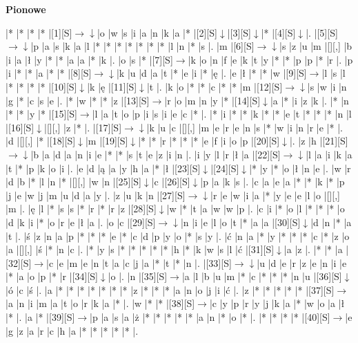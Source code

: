 \documentclass[11pt]{article}
\newcommand\drarr{$\rightarrow \!\!\!\!\! \downarrow$}
\newcommand\rarr{$\rightarrow$}
\newcommand\darr{$\downarrow$}
\begin{document}
\begin{PuzzleClues}{\textbf{Pionowe}\\}
\end{PuzzleClues}\newpage%

\noindent\begin{Puzzle}{17}{31}|*	|*	|*	|*	|[1][S]\drarr	|o	|w	|s	|i	|a	|n	|k	|a	|*	|[2][S]\darr	|[3][S]\darr	|*	|[4][S]\darr	|.
|[5][S]\drarr	|p	|a	|s	|k	|a	|l	|*	|*	|*	|*	|*	|*	|*	|l	|n	|*	|s	|.
|m	|[6][S]\drarr	|s	|z	|u	|m	|[][,]{ }	|b	|i	|a	|ł	|y	|*	|*	|a	|a	|*	|k	|.
|o	|s	|*	|[7][S]\rarr	|k	|o	|n	|f	|e	|k	|t	|y	|*	|*	|p	|p	|*	|r	|.
|p	|i	|*	|*	|a	|*	|*	|[8][S]\drarr	|k	|u	|d	|a	|t	|*	|e	|i	|*	|ę	|.
|e	|ł	|*	|*	|w	|[9][S]\rarr	|l	|s	|l	|*	|*	|*	|*	|[10][S]\darr	|k	|ę	|[11][S]\darr	|t	|.
|k	|o	|*	|*	|c	|*	|*	|m	|[12][S]\drarr	|s	|w	|i	|n	|g	|*	|c	|s	|e	|.
|*	|w	|*	|*	|z	|[13][S]\rarr	|r	|o	|m	|n	|y	|*	|[14][S]\darr	|a	|*	|i	|z	|k	|.
|*	|n	|*	|*	|y	|*	|[15][S]\rarr	|l	|a	|t	|o	|p	|i	|s	|i	|e	|c	|*	|.
|*	|i	|*	|*	|k	|*	|*	|e	|t	|*	|*	|*	|n	|l	|[16][S]\darr	|[][,]{ }	|z	|*	|.
|[17][S]\drarr	|k	|u	|c	|[][,]{ }	|m	|e	|r	|e	|n	|s	|*	|w	|i	|n	|r	|e	|*	|.
|d	|[][,]{ }	|*	|[18][S]\darr	|m	|[19][S]\darr	|*	|*	|r	|*	|*	|*	|e	|f	|i	|o	|p	|[20][S]\darr	|.
|z	|h	|[21][S]\drarr	|b	|a	|d	|a	|n	|i	|e	|*	|*	|s	|t	|e	|z	|i	|n	|.
|i	|y	|l	|r	|ł	|a	|[22][S]\drarr	|l	|a	|i	|k	|a	|t	|*	|p	|k	|o	|i	|.
|e	|d	|ą	|a	|y	|h	|a	|*	|ł	|[23][S]\darr	|[24][S]\darr	|*	|y	|*	|o	|ł	|n	|e	|.
|w	|r	|d	|b	|*	|l	|n	|*	|[][,]{ }	|w	|n	|[25][S]\darr	|c	|[26][S]\darr	|p	|a	|k	|s	|.
|c	|a	|e	|a	|*	|*	|k	|*	|p	|j	|e	|w	|j	|m	|u	|d	|a	|y	|.
|z	|u	|k	|n	|[27][S]\drarr	|r	|e	|w	|i	|a	|*	|y	|e	|e	|l	|o	|[][,]{ }	|m	|.
|ę	|l	|*	|s	|s	|*	|r	|*	|r	|z	|[28][S]\darr	|w	|*	|t	|a	|w	|w	|p	|.
|c	|i	|*	|o	|l	|*	|*	|*	|o	|d	|k	|i	|*	|o	|r	|e	|ł	|a	|.
|o	|c	|[29][S]\drarr	|n	|i	|e	|l	|o	|t	|*	|a	|a	|[30][S]\darr	|d	|n	|*	|a	|t	|.
|ś	|z	|n	|a	|p	|*	|*	|*	|e	|*	|c	|d	|p	|y	|o	|*	|s	|y	|.
|ć	|n	|a	|*	|y	|*	|*	|*	|c	|*	|z	|o	|a	|[][,]{ }	|ś	|*	|n	|c	|.
|*	|y	|s	|*	|*	|*	|*	|*	|h	|*	|k	|w	|s	|l	|ć	|[31][S]\darr	|a	|z	|.
|*	|*	|a	|[32][S]\rarr	|c	|e	|m	|e	|n	|t	|a	|c	|j	|a	|*	|t	|*	|n	|.
|[33][S]\drarr	|u	|d	|e	|r	|z	|e	|n	|i	|e	|*	|a	|o	|p	|*	|r	|[34][S]\darr	|o	|.
|n	|[35][S]\rarr	|a	|l	|b	|u	|m	|*	|c	|*	|*	|*	|n	|u	|[36][S]\darr	|ó	|c	|ś	|.
|a	|*	|*	|*	|*	|*	|*	|*	|z	|*	|*	|*	|a	|n	|o	|j	|i	|ć	|.
|z	|*	|*	|*	|*	|*	|[37][S]\rarr	|a	|n	|i	|m	|a	|t	|o	|r	|k	|a	|*	|.
|w	|*	|*	|[38][S]\rarr	|c	|y	|p	|r	|y	|j	|k	|a	|*	|w	|o	|a	|ł	|*	|.
|a	|*	|[39][S]\rarr	|p	|a	|s	|a	|ż	|*	|*	|*	|*	|*	|a	|n	|*	|o	|*	|.
|*	|*	|*	|*	|[40][S]\rarr	|e	|g	|z	|a	|r	|c	|h	|a	|*	|*	|*	|*	|*	|.\end{Puzzle}
\end{document}

